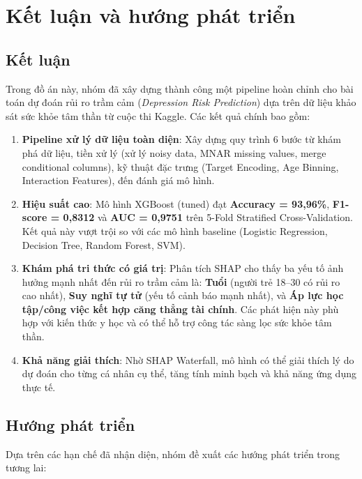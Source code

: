 \section{Kết luận và hướng phát triển}
\label{sec:conclusion}

\subsection{Kết luận}

Trong đồ án này, nhóm đã xây dựng thành công một pipeline hoàn chỉnh cho bài toán dự đoán rủi ro trầm cảm (\textit{Depression Risk Prediction}) dựa trên dữ liệu khảo sát sức khỏe tâm thần từ cuộc thi Kaggle. Các kết quả chính bao gồm:

\begin{enumerate}[noitemsep]
    \item \textbf{Pipeline xử lý dữ liệu toàn diện}: Xây dựng quy trình 6 bước từ khám phá dữ liệu, tiền xử lý (xử lý noisy data, MNAR missing values, merge conditional columns), kỹ thuật đặc trưng (Target Encoding, Age Binning, Interaction Features), đến đánh giá mô hình.
    
    \item \textbf{Hiệu suất cao}: Mô hình XGBoost (tuned) đạt \textbf{Accuracy = 93,96\%}, \textbf{F1-score = 0,8312} và \textbf{AUC = 0,9751} trên 5-Fold Stratified Cross-Validation. Kết quả này vượt trội so với các mô hình baseline (Logistic Regression, Decision Tree, Random Forest, SVM).
    
    \item \textbf{Khám phá tri thức có giá trị}: Phân tích SHAP cho thấy ba yếu tố ảnh hưởng mạnh nhất đến rủi ro trầm cảm là: \textbf{Tuổi} (người trẻ 18--30 có rủi ro cao nhất), \textbf{Suy nghĩ tự tử} (yếu tố cảnh báo mạnh nhất), và \textbf{Áp lực học tập/công việc kết hợp căng thẳng tài chính}. Các phát hiện này phù hợp với kiến thức y học và có thể hỗ trợ công tác sàng lọc sức khỏe tâm thần.
    
    \item \textbf{Khả năng giải thích}: Nhờ SHAP Waterfall, mô hình có thể giải thích lý do dự đoán cho từng cá nhân cụ thể, tăng tính minh bạch và khả năng ứng dụng thực tế.
\end{enumerate}

\subsection{Hướng phát triển}

Dựa trên các hạn chế đã nhận diện, nhóm đề xuất các hướng phát triển trong tương lai:

